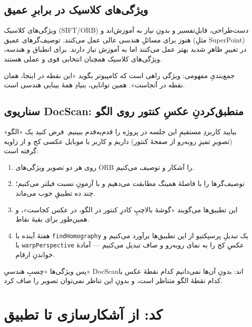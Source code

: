 \documentclass[12pt]{article}
\begin{document}
\subsection{ویژگی‌های کلاسیک در برابرِ عمیق}

ویژگی‌های کلاسیک (SIFT/ORB) دست‌طراحی، قابلِ‌تفسیر و بدونِ نیاز به آموزش‌اند و هنوز برای مسائلِ هندسی عالی عمل می‌کنند. توصیف‌گرهای عمیق (مثلِ SuperPoint) در تغییرِ ظاهرِ شدید بهتر عمل می‌کنند اما به آموزش نیاز دارند. برای انطباق و هندسه، ویژگی‌های کلاسیک همچنان انتخابی قوی و عملی هستند.

\begin{nokte}
جمع‌بندیِ مفهومی: ویژگی راهی است که کامپیوتر بگوید «این نقطه در اینجا، همان نقطه در آنجاست». همین توانایی، بنیادِ همهٔ بینایی هندسی است.
\end{nokte}

\subsection{سناریوی DocScan: منطبق‌کردنِ عکسِ کنتور روی الگو}

بیایید کاربردِ مستقیمِ این جلسه در پروژه را قدم‌به‌قدم ببینیم. فرض کنید یک «الگو» (تصویرِ تمیزِ روبه‌رو از صفحهٔ کنتور) داریم و کاربر با موبایل عکسی کج و از زاویه گرفته است:

\begin{enumerate}
  \item روی هر دو تصویر ویژگی‌های ORB را آشکار و توصیف می‌کنیم.
  \item توصیف‌گرها را با فاصلهٔ همینگ مطابقت می‌دهیم و با آزمونِ نسبت فیلتر می‌کنیم؛ چند ده تطبیقِ خوب می‌ماند.
  \item این تطبیق‌ها می‌گویند «گوشهٔ بالا‌چپِ کادرِ کنتور در الگو، در عکس کجاست»، و همین‌طور برای بقیهٔ نقاط.
  \item هفتهٔ آینده با \texttt{findHomography} یک تبدیلِ پرسپکتیو از این تطبیق‌ها برآورد می‌کنیم و با \texttt{warpPerspective} عکسِ کج را به نمای روبه‌رو و صاف تبدیل می‌کنیم — آمادهٔ خواندنِ ارقام.
\end{enumerate}

\begin{nokte}
پس ویژگی‌ها «چسبِ هندسیِ» DocScan‌اند: بدونِ آن‌ها نمی‌دانیم کدام نقطهٔ عکس با کدام نقطهٔ الگو متناظر است، و بدونِ این تناظر نمی‌توان تصویر را صاف کرد.
\end{nokte}

\section{کد: از آشکارسازی تا تطبیق}
\end{document}

